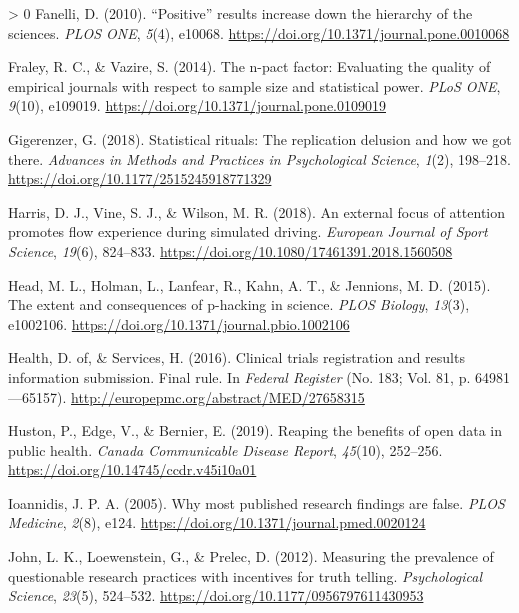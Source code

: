 \documentclass[]{cik}%
\newlength{\cslhangindent}
\newenvironment{CSLReferences}[3] %
 {%
  \setlength{\parindent}{0pt}
  \ifodd #1 \everypar{\setlength{\hangindent}{\cslhangindent}}\ignorespaces\fi
  \ifnum #2 > 0
  \setlength{\parskip}{#2\baselineskip}
  \fi
 }%
 {}
\begin{document}
\begin{CSLReferences}{1}{0}
\leavevmode\hypertarget{ref-fanelli_positive_2010}{}%
Fanelli, D. (2010). {``{Positive}''} results increase down the hierarchy
of the sciences. \emph{PLOS ONE}, \emph{5}(4), e10068.
\url{https://doi.org/10.1371/journal.pone.0010068}

\leavevmode\hypertarget{ref-fraley2014}{}%
Fraley, R. C., \& Vazire, S. (2014). The n-pact factor: Evaluating the
quality of empirical journals with respect to sample size and
statistical power. \emph{{PLoS} {ONE}}, \emph{9}(10), e109019.
\url{https://doi.org/10.1371/journal.pone.0109019}

\leavevmode\hypertarget{ref-gigerenzer2018}{}%
Gigerenzer, G. (2018). Statistical rituals: The replication delusion and
how we got there. \emph{Advances in Methods and Practices in
Psychological Science}, \emph{1}(2), 198--218.
\url{https://doi.org/10.1177/2515245918771329}

\leavevmode\hypertarget{ref-Harris2018}{}%
Harris, D. J., Vine, S. J., \& Wilson, M. R. (2018). An external focus
of attention promotes flow experience during simulated driving.
\emph{European Journal of Sport Science}, \emph{19}(6), 824--833.
\url{https://doi.org/10.1080/17461391.2018.1560508}

\leavevmode\hypertarget{ref-head_extent_2015}{}%
Head, M. L., Holman, L., Lanfear, R., Kahn, A. T., \& Jennions, M. D.
(2015). The extent and consequences of p-hacking in science. \emph{PLOS
Biology}, \emph{13}(3), e1002106.
\url{https://doi.org/10.1371/journal.pbio.1002106}

\leavevmode\hypertarget{ref-clinreg2016}{}%
Health, D. of, \& Services, H. (2016). Clinical trials registration and
results information submission. Final rule. In \emph{Federal Register}
(No. 183; Vol. 81, p. 64981---65157).
\url{http://europepmc.org/abstract/MED/27658315}

\leavevmode\hypertarget{ref-Huston2019}{}%
Huston, P., Edge, V., \& Bernier, E. (2019). Reaping the benefits of
open data in public health. \emph{Canada Communicable Disease Report},
\emph{45}(10), 252--256. \url{https://doi.org/10.14745/ccdr.v45i10a01}

\leavevmode\hypertarget{ref-ioannidis_why_2005}{}%
Ioannidis, J. P. A. (2005). Why most published research findings are
false. \emph{PLOS Medicine}, \emph{2}(8), e124.
\url{https://doi.org/10.1371/journal.pmed.0020124}

\leavevmode\hypertarget{ref-John_Loewenstein_Prelec_2012}{}%
John, L. K., Loewenstein, G., \& Prelec, D. (2012). Measuring the
prevalence of questionable research practices with incentives for truth
telling. \emph{Psychological Science}, \emph{23}(5), 524--532.
\url{https://doi.org/10.1177/0956797611430953}


\end{CSLReferences}
\end{document}

